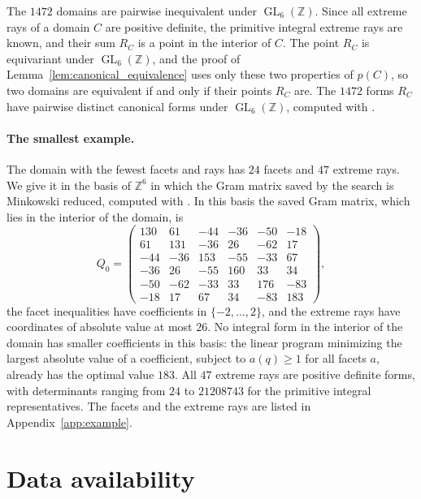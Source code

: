 \documentclass{amsart}
\newcommand{\GL}{\operatorname{GL}}
\newcommand{\ZZ}{\mathbb{Z}}
\begin{document}
The \(1472\) domains are pairwise inequivalent under \(\GL_6(\ZZ)\).  Since
all extreme rays of a domain \(C\) are positive definite, the primitive
integral extreme rays are known, and their sum \(R_C\) is a point in the
interior of \(C\).  The point \(R_C\) is equivariant under \(\GL_6(\ZZ)\), and
the proof of Lemma~\ref{lem:canonical_equivalence} uses only these two
properties of \(p(C)\), so two domains are equivalent if and only if their
points \(R_C\) are.  The \(1472\) forms \(R_C\) have pairwise distinct
canonical forms under \(\GL_6(\ZZ)\), computed with
\cite{DutourSikiricPolyhedralCommon}.

\paragraph{The smallest example.}
The domain with the fewest facets and rays has \(24\) facets and \(47\)
extreme rays.  We give it in the basis of \(\ZZ^6\) in which the Gram matrix
saved by the search is Minkowski reduced, computed with
\cite{DutourSikiricPolyhedralCommon}.  In this basis the saved Gram matrix,
which lies in the interior of the domain, is
\begin{equation}
Q_0=\begin{pmatrix}
 130 &   61 &  -44 &  -36 &  -50 &  -18\\
  61 &  131 &  -36 &   26 &  -62 &   17\\
 -44 &  -36 &  153 &  -55 &  -33 &   67\\
 -36 &   26 &  -55 &  160 &   33 &   34\\
 -50 &  -62 &  -33 &   33 &  176 &  -83\\
 -18 &   17 &   67 &   34 &  -83 &  183
\end{pmatrix},
\end{equation}
the facet inequalities have coefficients in \(\{-2,\ldots,2\}\), and the
extreme rays have coordinates of absolute value at most \(26\).  No integral
form in the interior of the domain has smaller coefficients in this basis:
the linear program minimizing the largest absolute value of a coefficient,
subject to \(a(q)\geq 1\) for all facets \(a\), already has the optimal
value \(183\).
All \(47\) extreme rays are positive definite forms, with determinants
ranging from \(24\) to \(21208743\) for the primitive integral
representatives.  The facets and the extreme rays are listed in
Appendix~\ref{app:example}.

\section*{Data availability}
\end{document}
